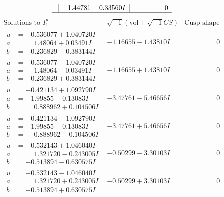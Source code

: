 \documentclass[1p]{elsarticle_modified}
\theoremstyle{definition}
\newcommand{\I}{\sqrt{-1}}
\begin{document}
$$\begin{array}{c|c|c}
 & \phantom{-}1.44781 + 0.33560 I & \phantom{-0.000000 } 0\\
 \hline 
 \end{array}$$\newpage$$\begin{array}{c|c|c}  
\text{Solutions to }I^u_{1}& \I (\text{vol} + \sqrt{-1}CS) & \text{Cusp shape}\\
 \hline 
\begin{aligned}
u &= -0.536077 + 1.040720 I \\
a &= \phantom{-}1.48064 + 0.03491 I \\
b &= -0.236829 - 0.383144 I\end{aligned}
 & -1.16655 - 1.43810 I & \phantom{-0.000000 } 0 \\ \hline\begin{aligned}
u &= -0.536077 - 1.040720 I \\
a &= \phantom{-}1.48064 - 0.03491 I \\
b &= -0.236829 + 0.383144 I\end{aligned}
 & -1.16655 + 1.43810 I & \phantom{-0.000000 } 0 \\ \hline\begin{aligned}
u &= -0.421134 + 1.092790 I \\
a &= -1.99855 + 0.13083 I \\
b &= \phantom{-}0.888962 + 0.104506 I\end{aligned}
 & -3.47761 - 5.46656 I & \phantom{-0.000000 } 0 \\ \hline\begin{aligned}
u &= -0.421134 - 1.092790 I \\
a &= -1.99855 - 0.13083 I \\
b &= \phantom{-}0.888962 - 0.104506 I\end{aligned}
 & -3.47761 + 5.46656 I & \phantom{-0.000000 } 0 \\ \hline\begin{aligned}
u &= -0.532143 + 1.046040 I \\
a &= \phantom{-}1.321720 - 0.243005 I \\
b &= -0.513894 - 0.630575 I\end{aligned}
 & -0.50299 - 3.30103 I & \phantom{-0.000000 } 0 \\ \hline\begin{aligned}
u &= -0.532143 - 1.046040 I \\
a &= \phantom{-}1.321720 + 0.243005 I \\
b &= -0.513894 + 0.630575 I\end{aligned}
 & -0.50299 + 3.30103 I & \phantom{-0.000000 } 0 \\ \hline\begin{aligned}

\end{aligned}
\end{array}$$
\end{document}
